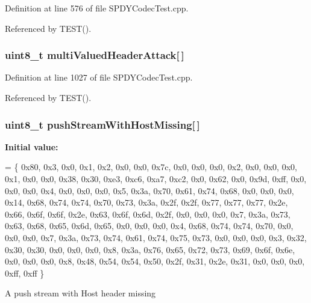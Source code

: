 Definition at line 576 of file S\+P\+D\+Y\+Codec\+Test.\+cpp.



Referenced by T\+E\+S\+T().

\subsubsection[{multi\+Valued\+Header\+Attack}]{\setlength{\rightskip}{0pt plus 5cm}uint8\+\_\+t multi\+Valued\+Header\+Attack[$\,$]}\label{SPDYCodecTest_8cpp_a2b0756a67089ddf098584d2d11b659cd}


Definition at line 1027 of file S\+P\+D\+Y\+Codec\+Test.\+cpp.



Referenced by T\+E\+S\+T().

\subsubsection[{push\+Stream\+With\+Host\+Missing}]{\setlength{\rightskip}{0pt plus 5cm}uint8\+\_\+t push\+Stream\+With\+Host\+Missing[$\,$]}\label{SPDYCodecTest_8cpp_a7114cf6fc04601d73f31ea2a8230813c}
{\bfseries Initial value\+:}
\begin{DoxyCode}
=
\{  0x80, 0x3, 0x0, 0x1, 0x2, 0x0, 0x0, 0x7c,
   0x0, 0x0, 0x0, 0x2, 0x0, 0x0, 0x0, 0x1,
   0x0, 0x0, 0x38, 0x30, 0xe3, 0xc6, 0xa7, 0xc2,
   0x0, 0x62, 0x0, 0x9d, 0xff, 0x0, 0x0, 0x0,
   0x4, 0x0, 0x0, 0x0, 0x5, 0x3a, 0x70, 0x61,
   0x74, 0x68, 0x0, 0x0, 0x0, 0x14, 0x68, 0x74,
   0x74, 0x70, 0x73, 0x3a, 0x2f, 0x2f, 0x77, 0x77,
   0x77, 0x2e, 0x66, 0x6f, 0x6f, 0x2e, 0x63, 0x6f,
   0x6d, 0x2f, 0x0, 0x0, 0x0, 0x7, 0x3a, 0x73,
   0x63, 0x68, 0x65, 0x6d, 0x65, 0x0, 0x0, 0x0,
   0x4, 0x68, 0x74, 0x74, 0x70, 0x0, 0x0, 0x0,
   0x7, 0x3a, 0x73, 0x74, 0x61, 0x74, 0x75, 0x73,
   0x0, 0x0, 0x0, 0x3, 0x32, 0x30, 0x30, 0x0,
   0x0, 0x0, 0x8, 0x3a, 0x76, 0x65, 0x72, 0x73,
   0x69, 0x6f, 0x6e, 0x0, 0x0, 0x0, 0x8, 0x48,
   0x54, 0x54, 0x50, 0x2f, 0x31, 0x2e, 0x31, 0x0,
   0x0, 0x0, 0xff, 0xff
\}
\end{DoxyCode}
A push stream with Host header missing 

